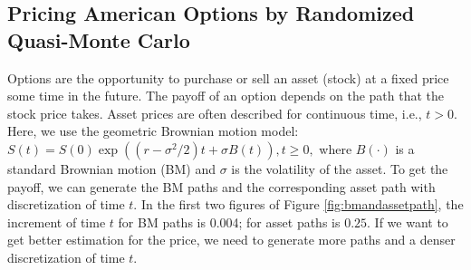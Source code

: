 \subsection{Pricing American Options by Randomized Quasi-Monte Carlo}
Options are the opportunity to purchase or sell an asset (stock) at a fixed price some time in the
future. 
The payoff of an option depends on the path that the stock price takes. 
Asset prices are often described for continuous time, i.e., $t > 0.$ Here, we use the geometric Brownian
motion model:
$S(t) = S(0) \exp((r - \sigma^2/2)t + \sigma B(t)), t \ge 0,$
where $B(\cdot )$ is a standard Brownian motion (BM) and $\sigma$ is the volatility of the asset. To get the payoff, we can generate the BM paths and the corresponding asset path with discretization of time $t$. In the first two figures of Figure \ref{fig:bmandassetpath}, the increment of time $t$ for BM paths is 0.004; for asset paths is $0.25$. If we want to get better estimation for the price, we need to generate more paths and a denser discretization of time $t$.

